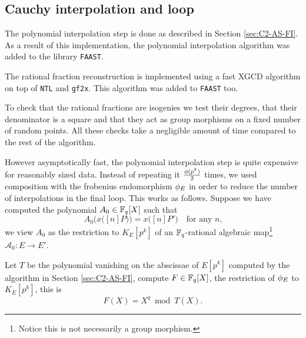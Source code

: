 \subsection{Cauchy interpolation and loop}
\label{sec:impl:cauchy}
The polynomial interpolation step is done as described in Section
\ref{sec:C2-AS-FI}. As a result of this implementation, the polynomial
interpolation algorithm was added to the library \texttt{FAAST}.

The rational fraction reconstruction is implemented using a fast XGCD
algorithm on top of \texttt{NTL} and \texttt{gf2x}. This algorithm was
added to \texttt{FAAST} too.

To check that the rational fractions are isogenies we test their
degrees, that their denominator is a square and that they act as group
morphisms on a fixed number of random points. All these checks take a
negligible amount of time compared to the rest of the algorithm.

However asymptotically fast, the polynomial interpolation step is
quite expensive for reasonably sized data. Instead of repeating it
$\frac{\phi(p^k)}{2}$ times, we used composition with the frobenius
endomorphism $\phi_E$ in order to reduce the number of
interpolations in the final loop. This works as follows. Suppose we
have computed the polynomial $A_0\in\mathbb{F}_q[X]$ such that
\begin{equation*}
  A_0\bigl(x\bigl([n]P\bigr)\bigr) = x\bigl([n]P'\bigr)
  \quad\text{for any $n$,}
\end{equation*}
we view $A_0$ as the restriction to $K_E[p^k]$ of an $\mathbb{F}_q$-rational
algebraic map\footnote{Notice this is not necessarily a group
  morphism.}  $\mathcal{A}_0:E\rightarrow E'$.

Let $T$ be the polynomial vanishing on the abscissae of $E[p^k]$
computed by the algorithm in Section \ref{sec:C2-AS-FI}, compute
$F\in\mathbb{F}_q[X]$, the restriction of $\phi_E$ to $K_E[p^k]$, this is
\begin{equation}
  \label{eq:frob}
  F(X) = X^q \bmod T(X)
  \text{.}
\end{equation}

